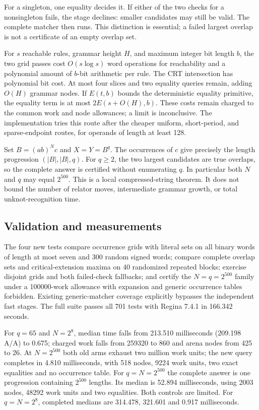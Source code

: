 For a singleton, one equality decides it. If either of the two checks for
a nonsingleton fails, the stage declines: smaller candidates may still be
valid. The complete matcher then runs. This distinction is essential;
a failed largest overlap is not a certificate of an empty overlap set.

For $s$ reachable rules, grammar height $H$, and maximum integer bit length
$b$, the two grid passes cost $O(s\log s)$ word operations for reachability
and a polynomial amount of $b$-bit arithmetic per rule. The CRT intersection
has polynomial bit cost. At most four slices and two equality queries remain,
adding $O(H)$ grammar nodes. If $E(t,b)$ bounds the deterministic equality
primitive, the equality term is at most $2E(s+O(H),b)$. These costs remain
charged to the common work and node allowances; a limit is inconclusive.
The implementation tries this route after the cheaper uniform, short-period,
and sparse-endpoint routes, for operands of length at least 128.

Set $B=(ab)^Nc$ and $X=Y=B^q$. The occurrences of $c$ give precisely the
length progression $(|B|,|B|,q)$. For $q\ge2$, the two largest candidates
are true overlaps, so the complete answer is certified without enumerating
$q$. In particular both $N$ and $q$ may equal $2^{500}$. This is a local
compressed-string theorem. It does not bound the number of relator moves,
intermediate grammar growth, or total unknot-recognition time.

\subsection{Validation and measurements}
The four new tests compare occurrence grids with literal sets on all binary
words of length at most seven and 300 random signed words; compare complete
overlap sets and critical-extension maxima on 40 randomized repeated blocks;
exercise disjoint grids and both failed-check fallbacks; and certify the
$N=q=2^{500}$ family under a 100000-work allowance with expansion and generic
occurrence tables forbidden. Existing generic-matcher coverage explicitly
bypasses the independent fast stages. The full suite passes all 701 tests
with Regina 7.4.1 in 166.342 seconds.





For $q=65$ and $N=2^8$, median time falls from 213.510 milliseconds
(209.198 A/A) to 0.675; charged work falls from 259320 to 860 and arena
nodes from 425 to 26. At $N=2^{500}$ both old arms exhaust two million
work units; the new query completes in 4.810 milliseconds, with 518 nodes,
9224 work units, two exact equalities and no occurrence table.
For $q=N=2^{500}$ the complete answer is one progression containing
$2^{500}$ lengths. Its median is 52.894 milliseconds, using 2003 nodes,
48292 work units and two equalities. Both controls are limited.
For $q=N=2^8$, completed medians are 314.478, 321.601 and 0.917 milliseconds.

